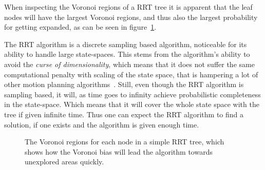 When inspecting the Voronoi regions of a \acl{RRT} tree it is apparent that the
leaf nodes will have the largest Voronoi regions, and thus also the largest
probability for getting expanded, as can be seen in
figure~\cref{fig:rrt-voronoi}.

The \ac{RRT} algorithm is a discrete sampling based algorithm, noticeable for
its ability to handle large state-spaces. This stems from the algorithm's
ability to avoid the \textit{curse of dimensionality}, which means that it does
not suffer the same computational penalty with scaling of the state space, that
is hampering a lot of other motion planning algorithms~\cite{Lav06}. Still, even
though the \ac{RRT} algorithm is sampling based, it will, as time goes to
infinity achieve probabilistic completeness in the state-space. Which means that
it will cover the whole state space with the tree if given infinite time. Thus
one can expect the \ac{RRT} algorithm to find a solution, if one exists and the
algorithm is given enough time.

\begin{figure}
  \centering {}
  \caption[The Voronoi regions for the nodes in a \ac{RRT} tree]{The Voronoi regions for each node in a simple RRT tree,
    which shows how the Voronoi bias will lead the algorithm towards unexplored
    areas quickly.}
  \label{fig:rrt-voronoi}
\end{figure}

